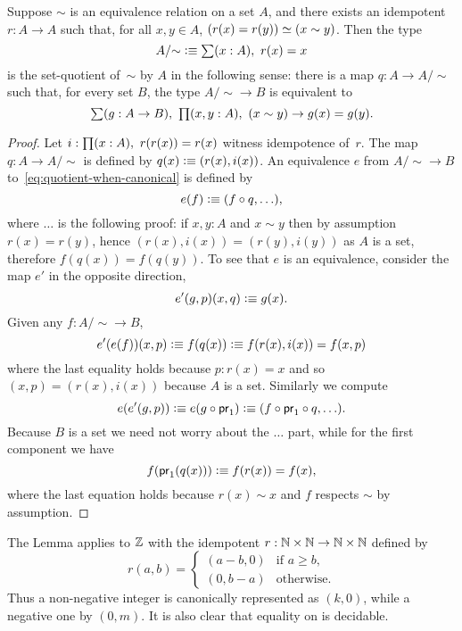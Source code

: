 \begin{lem}\label{lem:quotient-when-canonical-representatives}
  Suppose $\sim$ is an equivalence relation on a set $A$, and there exists an idempotent $r
  : A \to A$ such that, for all $x, y \in A$, $(r(x) = r(y)) \simeq (x \sim y)$. Then the
  type
  \begin{equation*}
    A/{\sim} \defeq \sm{x : A} r(x) = x
  \end{equation*}
  is the set-quotient of~$\sim$ by $A$ in the following sense: there is a map $q : A \to
  A/{\sim}$ such that, for every set $B$, the type $A/{\sim} \to B$ is equivalent to
  \begin{equation}
    \label{eq:quotient-when-canonical}
      \sm{g : A \to B} \prd{x, y : A} (x \sim y) \to g(x) = g(y).
  \end{equation}
\end{lem}

\begin{proof}
  Let $i : \prd{x : A} r(r(x)) = r(x)$ witness idempotence of~$r$.
  The map $q : A \to A/{\sim}$ is defined by $q(x) \vcentcolon\equiv (r(x), i(x))$. An equivalence $e$
  from $A/{\sim} \to B$ to~\eqref{eq:quotient-when-canonical} is defined by
  \[ e(f) \vcentcolon\equiv (f \circ q, {\ldots}), \]
  where $\ldots$ is the following proof: if $x, y : A$ and $x \sim y$ then by assumption
  $r(x) = r(y)$, hence $(r(x), i(x)) = (r(y), i(y))$ as $A$ is a set, therefore $f(q(x)) =
  f(q(y))$. To see that $e$ is an equivalence, consider the map $e'$ in the opposite
  direction,
  \[ e'(g, p) (x, q) \vcentcolon\equiv g(x). \]
  Given any $f : A/{\sim} \to B$,
  \[ e'(e(f))(x, p) \vcentcolon\equiv f(q(x)) \vcentcolon\equiv f(r(x), i(x)) = f(x, p) \]
  where the last equality holds because $p : r(x) = x$ and so $(x,p) = (r(x), i(x))$
  because $A$ is a set. Similarly we compute
  \[ e(e'(g, p)) \vcentcolon\equiv e(g \circ \mathsf{pr}_{1}) \vcentcolon\equiv (f \circ \mathsf{pr}_{1} \circ q, {\ldots}). \]
  Because $B$ is a set we need not worry about the $\ldots$ part, while for the first
  component we have
  \[ f(\mathsf{pr}_{1}(q(x))) \vcentcolon\equiv f(r(x)) = f(x), \]
  where the last equation holds because $r(x) \sim x$ and $f$ respects $\sim$ by
  assumption.
\end{proof}

The Lemma applies to $\mathbb{Z}$ with the idempotent $r : \mathbb{N} \times \mathbb{N} \to \mathbb{N} \times \mathbb{N}$
defined by
%
\begin{equation*}
  r(a, b) =
  \begin{cases}
    (a - b, 0) & \text{if $a \geq b$,} \\
    (0, b - a) & \text{otherwise.}
  \end{cases}  
\end{equation*}
%
Thus a non-negative integer is canonically represented as $(k, 0)$, while a negative
one by $(0, m)$. It is also clear that equality on \Z is decidable.

